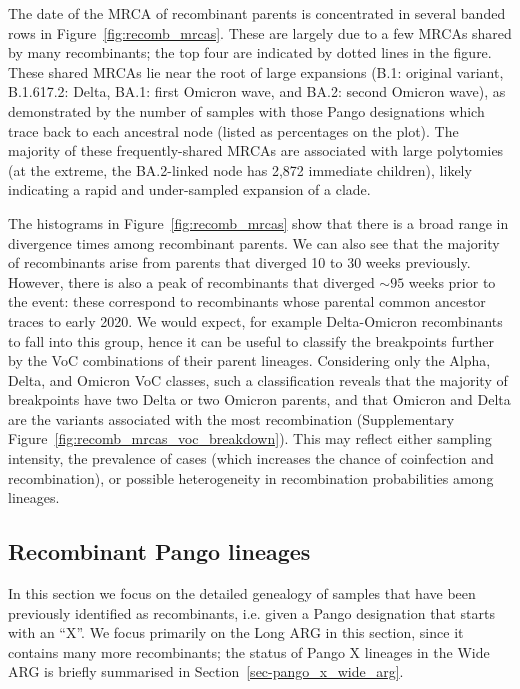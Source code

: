 \documentclass{article}
\begin{document}
The date of the MRCA of recombinant parents is
concentrated in several banded rows in Figure~\ref{fig:recomb_mrcas}. These are
largely due to a few MRCAs shared by many
recombinants; the top four are indicated by dotted lines in the
figure. These shared MRCAs lie near the root of large expansions
(B.1: original variant, B.1.617.2: Delta, BA.1: first Omicron wave,
and BA.2: second Omicron wave), as demonstrated by the number of samples with those
Pango designations which trace back to each ancestral node (listed as
percentages on the plot). The majority of these frequently-shared MRCAs
are associated with large polytomies (at the extreme,
the BA.2-linked node has 2,872 immediate children), likely
indicating a rapid and under-sampled expansion of a clade.

The histograms in Figure~\ref{fig:recomb_mrcas} show that there is a
broad range in divergence times among recombinant parents.
We can also see that the majority of recombinants arise
from parents that diverged 10 to 30 weeks
previously. However, there is also a peak of recombinants that diverged
${\sim}95$ weeks prior to the event: these correspond to recombinants whose
parental common ancestor traces to early 2020. We would expect, for example
Delta-Omicron recombinants to fall into this group, hence it can be
useful to classify the breakpoints further by the VoC combinations of their
parent lineages. Considering only the Alpha, Delta, and Omicron VoC classes,
such a classification reveals that the majority of breakpoints have two Delta or
two Omicron parents, and that Omicron and Delta are the variants associated
with the most recombination (Supplementary Figure~\ref{fig:recomb_mrcas_voc_breakdown}).
This may reflect either sampling intensity, the
prevalence of cases (which increases the
chance of coinfection and recombination), or possible heterogeneity in
recombination probabilities among lineages.

\subsection{Recombinant Pango lineages}
\label{sec:pango_x_lineages}

In this section we focus on the detailed genealogy of samples that have been
previously identified as recombinants, i.e. given a Pango designation that
starts with an ``X''. We focus primarily on the Long ARG in this section,
since it contains many more recombinants; the status
of Pango X lineages in the Wide ARG is briefly summarised in Section~\ref{sec-pango_x_wide_arg}.
\end{document}
